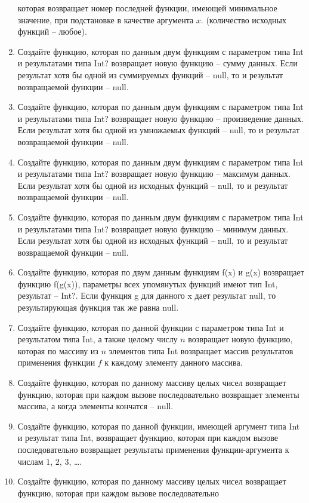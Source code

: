 \begin{enumerate}
		которая возвращает номер последней функции, имеющей минимальное значение, при подстановке в качестве аргумента $x$.
		(количество исходных функций -- любое).
	\item Создайте функцию, которая по данным двум функциям с параметром типа Int и результатами типа Int? возвращает новую функцию -- сумму данных.
		Если результат хотя бы одной из суммируемых функций -- null, то и результат возвращаемой функции -- null.
	\item Создайте функцию, которая по данным двум функциям с параметром типа Int и результатами типа Int? возвращает новую функцию -- произведение данных.
	Если результат хотя бы одной из умножаемых функций -- null, то и результат возвращаемой функции -- null.
	\item Создайте функцию, которая по данным двум функциям с параметром типа Int и результатами типа Int? возвращает новую функцию -- максимум данных.
		Если результат хотя бы одной из исходных функций -- null, то и результат возвращаемой функции -- null.
\item Создайте функцию, которая по данным двум функциям с параметром типа Int и результатами типа Int? возвращает новую функцию -- минимум данных.
			Если результат хотя бы одной из исходных функций -- null, то и результат возвращаемой функции -- null.
		\item Создайте функцию, которая по двум данным функциям f(x) и g(x) возвращает функцию f(g(x)), параметры всех упомянутых функций
			имеют тип Int, результат -- Int?. Если функция g для данного x дает результат null, то результирующая функция так же
			равна null.
	\item Создайте функцию, которая по данной функции с параметром типа Int и результатом типа Int, а также целому числу $n$
		возвращает новую функцию, которая по массиву из $n$ элементов типа Int возвращает массив результатов применения функции $f$ 
		к каждому элементу данного массива.
	\item Создайте функцию, которая по данному массиву целых чисел возвращает функцию, которая при каждом вызове последовательно
		возвращает элементы массива, а когда элементы кончатся -- null.
	\item Создайте функцию, которая по данной функции, имеющей аргумент типа Int и результат типа Int, возвращает функцию, 
		которая при каждом вызове последовательно возвращает результаты применения функции-аргумента к числам $1$, $2$, $3$, \dots.
	\item Создайте функцию, которая по данному массиву целых чисел возвращает функцию, которая при каждом вызове последовательно

\end{enumerate}
